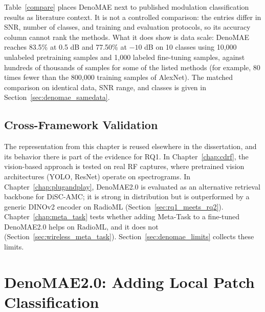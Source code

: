 
Table~\ref{compare} places DenoMAE next to published modulation classification results as literature context. It is not a controlled comparison: the entries differ in SNR, number of classes, and training and evaluation protocols, so its accuracy column cannot rank the methods. What it does show is data scale: DenoMAE reaches 83.5\% at 0.5 dB and 77.50\% at $-10$ dB on 10 classes using 10,000 unlabeled pretraining samples and 1,000 labeled fine-tuning samples, against hundreds of thousands of samples for some of the listed methods (for example, 80 times fewer than the 800,000 training samples of AlexNet). The matched comparison on identical data, SNR range, and classes is given in Section~\ref{sec:denomae_samedata}.

\subsection{Cross-Framework Validation}

The representation from this chapter is reused elsewhere in the dissertation, and its behavior there is part of the evidence for RQ1. In Chapter~\ref{chap:cdrf}, the vision-based approach is tested on real RF captures, where pretrained vision architectures (YOLO, ResNet) operate on spectrograms. In Chapter~\ref{chap:plugandplay}, DenoMAE2.0 is evaluated as an alternative retrieval backbone for DiSC-AMC; it is strong in distribution but is outperformed by a generic DINOv2 encoder on RadioML (Section~\ref{sec:rq1_meets_rq2}). Chapter~\ref{chap:meta_task} tests whether adding Meta-Task to a fine-tuned DenoMAE2.0 helps on RadioML, and it does not (Section~\ref{sec:wireless_meta_task}). Section~\ref{sec:denomae_limits} collects these limits.


\section{DenoMAE2.0: Adding Local Patch Classification}
\label{sec:denomae2}

